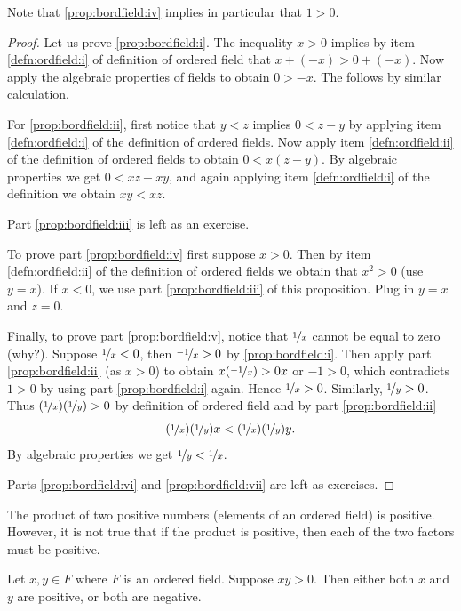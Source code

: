 Note that \ref{prop:bordfield:iv} implies in particular that $1 > 0$.

\begin{proof}
Let us prove \ref{prop:bordfield:i}.  The inequality $x > 0$ implies by item
\ref{defn:ordfield:i} of definition of ordered field that
$x + (-x) > 0 + (-x)$.  Now apply the algebraic properties of fields to
obtain $0 > -x$.  The  follows by similar calculation.

For \ref{prop:bordfield:ii}, first notice that $y < z$ implies
$0 < z - y$ by applying 
item \ref{defn:ordfield:i} of the definition of ordered fields.  
Now apply item 
\ref{defn:ordfield:ii} of the definition of ordered fields to obtain
$0 < x(z-y)$.  By algebraic properties we get $0 < xz - xy$,
and again applying item
\ref{defn:ordfield:i} of the definition we obtain $xy < xz$.

Part \ref{prop:bordfield:iii} is left as an exercise.

To prove part \ref{prop:bordfield:iv} first suppose $x > 0$.  Then
by item 
\ref{defn:ordfield:ii} of the definition of ordered fields we obtain
that $x^2 > 0$ (use $y=x$).  If $x < 0$, we use 
part \ref{prop:bordfield:iii} of this proposition.  Plug in $y=x$ and
$z=0$.

Finally, to prove part \ref{prop:bordfield:v}, notice that
$\nicefrac{1}{x}$ cannot be equal to zero (why?).
Suppose $\nicefrac{1}{x} < 0$,
then $\nicefrac{-1}{x} > 0$ by \ref{prop:bordfield:i}.  Then apply
part \ref{prop:bordfield:ii} (as $x > 0$) to obtain
$x(\nicefrac{-1}{x}) > 0x$ or $-1 > 0$, which contradicts $1 > 0$ by using part
\ref{prop:bordfield:i} again.  Hence $\nicefrac{1}{x} > 0$.
Similarly, $\nicefrac{1}{y} > 0$.  Thus $(\nicefrac{1}{x})(\nicefrac{1}{y}) > 0$
by definition of ordered field and by part \ref{prop:bordfield:ii}
\begin{equation*}
(\nicefrac{1}{x})(\nicefrac{1}{y})x < (\nicefrac{1}{x})(\nicefrac{1}{y})y .
\end{equation*}
By algebraic properties we get $\nicefrac{1}{y} < \nicefrac{1}{x}$.

Parts \ref{prop:bordfield:vi} and \ref{prop:bordfield:vii} are left as
exercises.
\end{proof}

The product of two positive numbers (elements of an ordered field) is positive.
However, it is not true that if the product is positive, then each of the two
factors must be positive.

\begin{prop}
Let $x,y \in F$ where $F$ is an ordered field.  Suppose 
$xy > 0$.  Then either both $x$ and $y$ are positive, or both are negative.
\end{prop}

